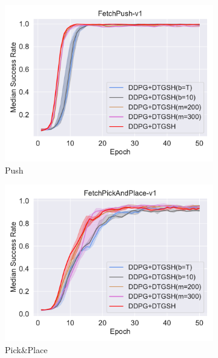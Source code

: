 \begin{figure}[h!]
\centering
  \begin{subfigure}[t]{0.49\textwidth}
    \includegraphics[width=\textwidth]{figures/chapter4/FetchPush-v1_ab2.pdf}
    \caption{Push}
    \label{subfig:baseline_push_ab2}
  \end{subfigure}\hfill
  \begin{subfigure}[t]{0.49\textwidth}
    \includegraphics[width=\textwidth]{figures/chapter4/FetchPickAndPlace-v1_ab2.pdf}
    \caption{Pick\&Place}
    \label{subfig:baseline_pick_ab2}
  \end{subfigure}\hfill
  \begin{subfigure}[t]{0.49\textwidth}

\end{subfigure}
\end{figure}
